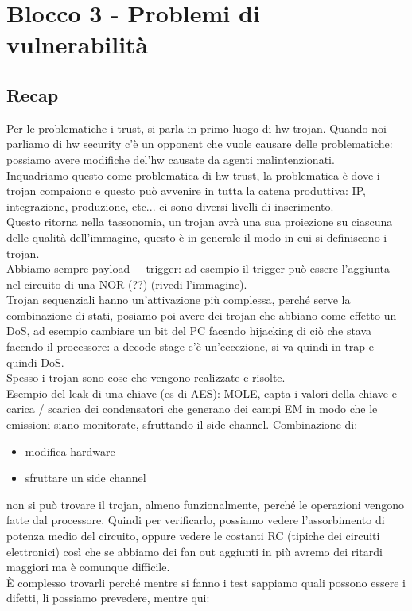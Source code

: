 \documentclass[oneside, 12pt]{extbook}
\begin{document}
\chapter{Blocco 3 - Problemi di vulnerabilità}
\section{Recap}
Per le problematiche i trust, si parla in primo luogo di hw trojan. Quando noi parliamo di hw security c'è un opponent che vuole causare delle problematiche: possiamo avere modifiche del'hw causate da agenti malintenzionati.\\Inquadriamo questo come problematica di hw trust, la problematica è dove i trojan compaiono e questo può avvenire in tutta la catena produttiva: IP, integrazione, produzione, etc... ci sono diversi livelli di inserimento.\\Questo ritorna nella tassonomia, un trojan avrà una sua proiezione su ciascuna delle qualità dell'immagine, questo è in generale il modo in cui si definiscono i trojan.\\Abbiamo sempre payload + trigger: ad esempio il trigger può essere l'aggiunta nel circuito di una NOR (??) (rivedi l'immagine).\\Trojan sequenziali hanno un'attivazione più complessa, perché serve la combinazione di stati, posiamo poi avere dei trojan che abbiano come effetto un DoS, ad esempio cambiare un bit del PC facendo hijacking di ciò che stava facendo il processore: a decode stage c'è un'eccezione, si va quindi in trap e quindi DoS.\\Spesso i trojan sono cose che vengono realizzate e risolte.\\Esempio del leak di una chiave (es di AES): MOLE, capta i valori della chiave e carica / scarica dei condensatori che generano dei campi EM in modo che le emissioni siano monitorate, sfruttando il side channel. Combinazione di:
\begin{itemize}
	\item modifica hardware
	\item sfruttare un side channel
\end{itemize}
non si può trovare il trojan, almeno funzionalmente, perché le operazioni vengono fatte dal processore. Quindi per verificarlo, possiamo vedere l'assorbimento di potenza medio del circuito, oppure vedere le costanti RC (tipiche dei circuiti elettronici) così che se abbiamo dei fan out aggiunti in più avremo dei ritardi maggiori ma è comunque difficile.\\È complesso trovarli perché mentre si fanno i test sappiamo quali possono essere i difetti, li possiamo prevedere, mentre qui:
\end{document}
